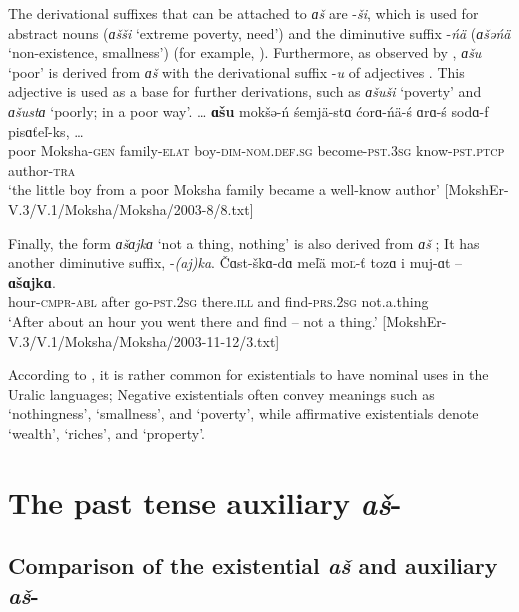 \documentclass[output=paper]{langsci/langscibook}
\begin{document}
  The derivational suffixes that can be attached to \textit{ɑš} are -\textit{ši}, which is used for abstract nouns (\textit{ɑšši} `extreme poverty, need') and the diminutive suffix -\textit{ńä} (\textit{ɑšəńä} `non-existence, smallness') (for example, \citealt[73]{MWb}). Furthermore, as observed by \citet[79]{Bartens1996}, \textit{ɑšu} `poor' is derived from \textit{ɑš} with the derivational suffix -\textit{u} of adjectives . This adjective is used as a base for further derivations, such as \textit{ɑšuši} `poverty' and \textit{ɑšustɑ} `poorly; in a poor way'.
\ea\label{ex:moksha-poor}
\gll \ob\ldots{\cb} \textbf{ɑšu} mokšə-ń śemjä-stɑ ćorɑ-ńä-ś
ɑrɑ-ś sodɑ-f pisɑťeľ-ks, \ob\ldots{\cb}\\
{} poor Moksha-\textsc{gen} family-\textsc{elat} boy-\textsc{dim-nom.def.sg} become-\textsc{pst.3sg} know-\textsc{pst.ptcp} author-\textsc{tra}\\
\glt `the little boy from a poor Moksha family became a well-know author' [MokshEr-V.3/V.1/Moksha/Moksha/2003-8/8.txt]
\z

  Finally, the form \textit{ɑšɑjkɑ} `not a thing, nothing' \citep[51]{MRV} is also derived from \textit{ɑš} ; It has another diminutive suffix, -\textit{(aj)ka}.
\ea\label{ex:moksha-find}
\gll Čɑst-škɑ-dɑ meľä mo\textsc{ľ}-ť tozɑ i muj-ɑt -- \textbf{ɑšɑjkɑ}.\\
hour-\textsc{cmpr-abl} after go-\textsc{pst.2sg} there.\textsc{ill} and find-\textsc{prs.2sg} {} not.a.thing\\
\glt `After about an hour you went there and find -- not a thing.' [MokshEr-V.3/V.1/Moksha/Moksha/2003-11-12/3.txt]
\z

  According to \citet[in passim]{Bartens1996}, it is rather common for existentials to have nominal uses in the Uralic languages; Negative existentials often convey meanings such as `nothingness', `smallness', and `poverty', while affirmative existentials denote `wealth', `riches', and `property'.

\section{The past tense auxiliary \textit{aš}-}\label{sec:2:6}

\subsection{Comparison of the existential \textit{aš} and auxiliary \textit{aš}-}\label{sec:2:6.1}
\end{document}
